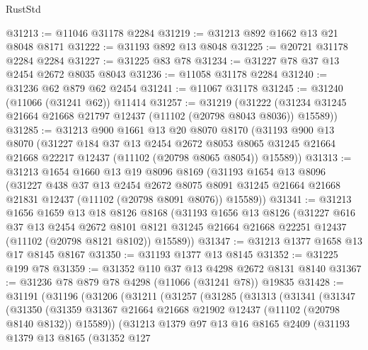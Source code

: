 \begin{lexlean}{RustStd}
\begin{coremodule}
@31213 := @11046 @31178 @2284
@31219 := @31213 @892 @1662 @13 @21 @8048 @8171
@31222 := @31193 @892 @13 @8048
@31225 := @20721 @31178 @2284 @2284
@31227 := @31225 @83 @78
@31234 := @31227 @78 @37 @13 @2454 @2672 @8035 @8043
@31236 := @11058 @31178 @2284
@31240 := @31236 @62 @879 @62 @2454
@31241 := @11067 @31178
@31245 := @31240 (@11066 (@31241 @62)) @11414
@31257 := @31219
    (@31222 (@31234 @31245 @21664 @21668 @21797 @12437 (@11102 (@20798 @8043 @8036)) @15589))
@31285 := @31213
    @900
    @1661
    @13
    @20
    @8070
    @8170
    (@31193
      @900
      @13
      @8070
      (@31227
        @184
        @37
        @13
        @2454
        @2672
        @8053
        @8065
        @31245
        @21664
        @21668
        @22217
        @12437
        (@11102 (@20798 @8065 @8054))
        @15589))
@31313 := @31213
    @1654
    @1660
    @13
    @19
    @8096
    @8169
    (@31193
      @1654
      @13
      @8096
      (@31227
        @438
        @37
        @13
        @2454
        @2672
        @8075
        @8091
        @31245
        @21664
        @21668
        @21831
        @12437
        (@11102 (@20798 @8091 @8076))
        @15589))
@31341 := @31213
    @1656
    @1659
    @13
    @18
    @8126
    @8168
    (@31193
      @1656
      @13
      @8126
      (@31227
        @616
        @37
        @13
        @2454
        @2672
        @8101
        @8121
        @31245
        @21664
        @21668
        @22251
        @12437
        (@11102 (@20798 @8121 @8102))
        @15589))
@31347 := @31213 @1377 @1658 @13 @17 @8145 @8167
@31350 := @31193 @1377 @13 @8145
@31352 := @31225 @199 @78
@31359 := @31352 @110 @37 @13 @4298 @2672 @8131 @8140
@31367 := @31236 @78 @879 @78 @4298 (@11066 (@31241 @78)) @19835
@31428 := @31191
    (@31196
      (@31206
        (@31211
          (@31257
            (@31285
              (@31313
                (@31341
                  (@31347
                    (@31350
                      (@31359
                        @31367
                        @21664
                        @21668
                        @21902
                        @12437
                        (@11102 (@20798 @8140 @8132))
                        @15589))
                    (@31213
                      @1379
                      @97
                      @13
                      @16
                      @8165
                      @2409
                      (@31193
                        @1379
                        @13
                        @8165
                        (@31352
                          @127

\end{coremodule}
\end{lexlean}
